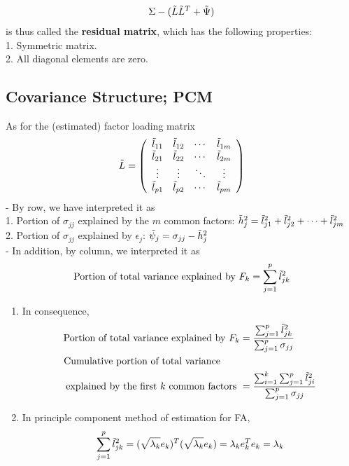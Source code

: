 \documentclass[12pt]{extarticle}
\newcommand{\<}{\langle}
\renewcommand{\>}{\rangle}
\theoremstyle{definition}
\begin{document}
\begin{tcolorbox}[enhanced, drop fuzzy shadow, title=Principal Component Method; Residual Matrix]
\begin{align*}
    \Sigma - (\Tilde{L}\Tilde{L}^T + \Tilde{\Psi})
\end{align*}
is thus called the \textbf{residual matrix}, which has the following properties:\\
1. Symmetric matrix.\\
2. All diagonal elements are zero.
\end{tcolorbox}

\subsection{Covariance Structure; PCM}
As for the (estimated) factor loading matrix
\begin{align*}
    \Tilde{L}= \left(\begin{array}{cccc}
        \Tilde{l}_{11} & \Tilde{l}_{12} & \cdots & \Tilde{l}_{1m} \\
        \Tilde{l}_{21} & \Tilde{l}_{22} & \cdots & \Tilde{l}_{2m} \\
        \vdots & \vdots & \ddots & \vdots \\
        \Tilde{l}_{p1} & \Tilde{l}_{p2} & \cdots & \Tilde{l}_{pm}
        \end{array} \right)
\end{align*}
 - By row, we have interpreted it as\\
 1. Portion of $\sigma_{jj}$ explained by the $m$ common factors: $\Tilde{h}^2_j = \Tilde{l}^2_{j1}+\Tilde{l}^2_{j2}+\cdots+\Tilde{l}^2_{jm}$\\
 2. Portion of $\sigma_{jj}$ explained by $\epsilon_j$: $\Tilde{\psi}_j =\sigma_{jj} -\Tilde{h}^2_j$\\
 
 - In addition, by column, we interpreted it as
 \begin{align*}
     \text{Portion of total variance explained by } F_k=\sum^p_{j=1} \Tilde{l}^2_{jk}
 \end{align*}
\begin{enumerate}
    \item In consequence,
    \begin{align*}
        \text{Portion of total variance explained by } F_k &= \frac{\sum^p_{j=1} \Tilde{l}^2_{jk}}{\sum^p_{j=1} \sigma_{jj}}\\
        \text{Cumulative portion of total variance} \qquad &\\
        \text{explained by the first $k$ common factors } &= \frac{\sum^k_{i=1}\sum^p_{j=1}\Tilde{l}^2_{ji}}{\sum^p_{j=1}\sigma_{jj}}
    \end{align*}
    \item In principle component method of estimation for FA,
    \begin{align*}
        \sum^p_{j=1} \Tilde{l}^2_{jk} = (\sqrt{\lambda_k}e_k)^T (\sqrt{\lambda_k}e_k) = \lambda_k e_k^T e_k = \lambda_k
    \end{align*}
\end{enumerate}
\end{document}
